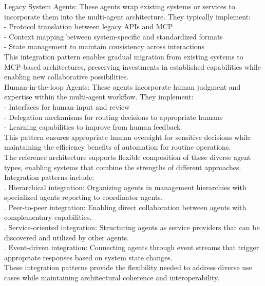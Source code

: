 Legacy System Agents: These agents wrap existing systems or services to incorporate them into the multi-agent architecture. They typically implement:\\ \newline
- Protocol translation between legacy APIs and MCP\\ \newline
- Context mapping between system-specific and standardized formats\\ \newline
- State management to maintain consistency across interactions\\ \newline
This integration pattern enables gradual migration from existing systems to MCP-based architectures, preserving investments in established capabilities while enabling new collaborative possibilities.\\ \newline
Human-in-the-loop Agents: These agents incorporate human judgment and expertise within the multi-agent workflow. They implement:\\ \newline
- Interfaces for human input and review\\ \newline
- Delegation mechanisms for routing decisions to appropriate humans\\ \newline
- Learning capabilities to improve from human feedback\\ \newline
This pattern ensures appropriate human oversight for sensitive decisions while maintaining the efficiency benefits of automation for routine operations.\\ \newline
The reference architecture supports flexible composition of these diverse agent types, enabling systems that combine the strengths of different approaches. Integration patterns include:\\ . Hierarchical integration: Organizing agents in management hierarchies with specialized agents reporting to coordinator agents.\\ . Peer-to-peer integration: Enabling direct collaboration between agents with complementary capabilities.\\ . Service-oriented integration: Structuring agents as service providers that can be discovered and utilized by other agents.\\ . Event-driven integration: Connecting agents through event streams that trigger appropriate responses based on system state changes.\\ \newline
These integration patterns provide the flexibility needed to address diverse use cases while maintaining architectural coherence and interoperability.\\
